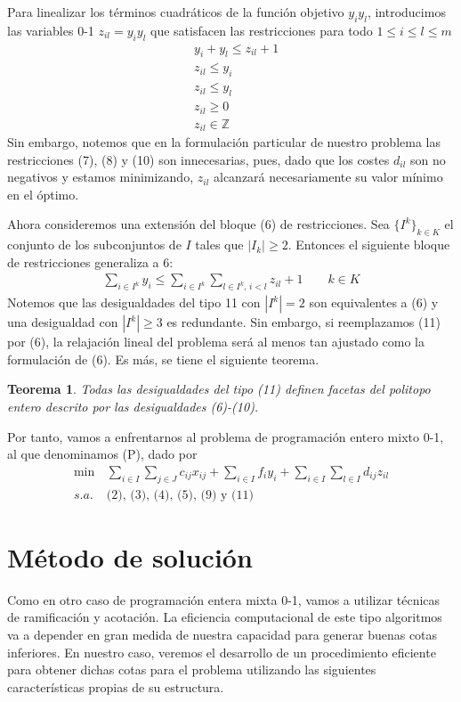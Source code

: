 \documentclass[twoside,12pt]{article}
\newtheorem{theorem}{Teorema}
\begin{document}
\newpage
Para linealizar los términos cuadráticos de la función objetivo $y_iy_l$, introducimos las variables 0-1 $z_{il} = y_iy_l$ que satisfacen las restricciones para todo $1\leq i \leq l \leq m$
\begin{align}
&y_i+y_l\leq z_{il}+1\\
&z_{il} \leq y_i\\
&z_{il}\leq y_l\\
&z_{il}\geq 0\\
&z_{il}\in \mathbb{Z}
\end{align}
Sin embargo, notemos que en la formulación particular de nuestro problema las restricciones (7), (8) y (10) son innecesarias, pues, dado que los costes $d_{il}$ son no negativos y estamos minimizando, $z_{il}$ alcanzará necesariamente su valor mínimo en el óptimo. 

Ahora consideremos una extensión del bloque (6) de restricciones. Sea $\{I^k\}_{k\in K}$ el conjunto de los subconjuntos de $I$ tales que $|I_k|\geq 2$. Entonces el siguiente bloque de restricciones generaliza a 6:
\begin{align}
\sum_{i\in I^k} y_i \leq  \sum_{i\in I^k} \sum_{l\in I^k,\,i<l} z_{il} +1 \qquad k\in K
\end{align}
Notemos que las desigualdades del tipo 11 con $|I^k| =2$ son equivalentes a (6) y una desigualdad con $|I^k|\geq 3$ es redundante. Sin embargo, si reemplazamos (11) por (6), la relajación lineal del problema será al menos tan ajustado como la formulación de (6). Es más, se tiene el siguiente teorema.
\begin{theorem}Todas las desigualdades del tipo (11) definen facetas del politopo entero descrito por las desigualdades (6)-(10). 
\end{theorem}
Por tanto, vamos a enfrentarnos al problema de programación entero mixto 0-1, al que denominamos (P), dado por
\begin{align*}
\min \,& \sum_{i\in I} \sum_{j\in J} c_{ij}x_{ij} + \sum_{i\in I} f_i y_i + \sum_{i \in I}\sum_{l \in I} d_{ij}z_{il}\\
s.a.\,& \text{(2), (3), (4), (5), (9) y (11)}
\end{align*}
\section{Método de solución}
Como en otro caso de programación entera mixta 0-1, vamos a utilizar técnicas de ramificación y acotación. La eficiencia computacional de este tipo algoritmos va a depender en gran medida de nuestra capacidad para generar buenas cotas inferiores. En nuestro caso, veremos el desarrollo de un procedimiento eficiente para obtener dichas cotas para el problema utilizando las siguientes características propias de su estructura.
\end{document}
